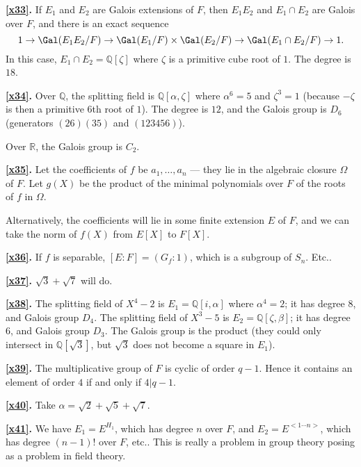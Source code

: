 \documentclass[a4paper,11pt,final,openany]{memoir}
\theoremstyle{nonumberplain}
\begin{document}
\medskip\noindent\textbf{\ref{x33}.} If $E_{1}$ and $E_{2}$ are Galois
extensions of $F$, then $E_{1}E_{2}$ and $E_{1}\cap E_{2}$ are Galois over
$F$, and there is an exact sequence
\[
1\to\Gal(E_{1}E_{2}/F)\to\Gal(E_{1}/F)\times\Gal(E_{2}/F)\to\Gal(E_{1}\cap
E_{2}/F)\to1.
\]
In this case, $E_{1}\cap E_{2}={\mathbb{Q}}[\zeta]$ where $\zeta$ is a
primitive cube root of $1$. The degree is $18$.

\medskip\noindent\textbf{\ref{x34}.} Over ${\mathbb{Q}}$, the splitting field
is ${\mathbb{Q}}[\alpha,\zeta]$ where $\alpha^{6}=5$ and $\zeta^{3}=1$
(because $-\zeta$ is then a primitive $6$th root of $1$). The degree is $12$,
and the Galois group is $D_{6}$ (generators $(26)(35)$ and $(123456)$).

Over $\mathbb{R}$, the Galois group is $C_{2}$.

\medskip\noindent\textbf{\ref{x35}.} Let the coefficients of $f$ be
$a_{1},\ldots,a_{n}$ --- they lie in the algebraic closure $\Omega$ of $F$.
Let $g(X)$ be the product of the minimal polynomials over $F$ of the roots of
$f$ in $\Omega$.

Alternatively, the coefficients will lie in some finite extension $E$ of $F$,
and we can take the norm of $f(X)$ from $E[X]$ to $F[X]$.

\medskip\noindent\textbf{\ref{x36}.} If $f$ is separable, $[E\colon
F]=(G_{f}\colon1)$, which is a subgroup of $S_{n}$. Etc..

\medskip\noindent\textbf{\ref{x37}.} $\sqrt{3}+\sqrt{7}$ will do.

\medskip\noindent\textbf{\ref{x38}.} The splitting field of $X^{4}-2$ is
$E_{1}={\mathbb{Q}}[i,\alpha]$ where $\alpha^{4}=2$; it has degree $8$, and
Galois group $D_{4}$. The splitting field of $X^{3}-5$ is $E_{2}={\mathbb{Q}%
}[\zeta,\beta]$; it has degree $6$, and Galois group $D_{3}$. The Galois group
is the product (they could only intersect in ${\mathbb{Q}}[\sqrt{3}]$, but
$\sqrt{3}$ does not become a square in $E_{1}$).

\medskip\noindent\textbf{\ref{x39}.} The multiplicative group of $F$ is cyclic
of order $q-1$. Hence it contains an element of order $4$ if and only if
$4|q-1$.

\medskip\noindent\textbf{\ref{x40}.} Take $\alpha=\sqrt{2}+\sqrt{5}+\sqrt{7}$.

\medskip\noindent\textbf{\ref{x41}.} We have $E_{1}=E^{H_{1}}$, which has
degree $n$ over $F$, and $E_{2}=E^{<1\cdots n>}$, which has degree $(n-1)!$
over $F$, etc.. This is really a problem in group theory posing as a problem
in field theory.
\end{document}
